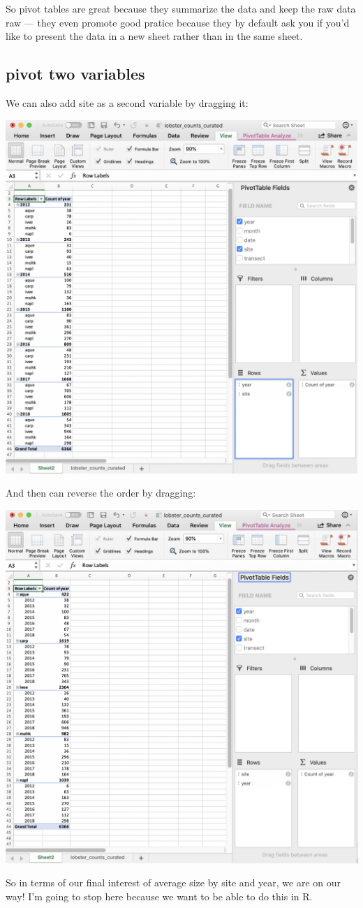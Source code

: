 \documentclass[]{book}
\begin{document}
So pivot tables are great because they summarize the data and keep the raw data raw --- they even promote good pratice because they by default ask you if you'd like to present the data in a new sheet rather than in the same sheet.

\hypertarget{pivot-two-variables}{%
\subsection{pivot two variables}\label{pivot-two-variables}}

We can also add site as a second variable by dragging it:

\includegraphics[width=0.6\linewidth]{img/pivot-table-count-year-site}

And then can reverse the order by dragging:

\includegraphics[width=0.6\linewidth]{img/pivot-table-count-site-year}

So in terms of our final interest of average size by site and year, we are on our way! I'm going to stop here because we want to be able to do this in R.
\end{document}
